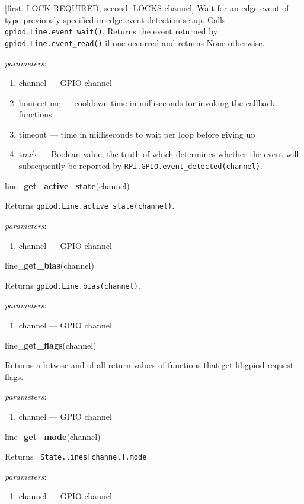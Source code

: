 \documentclass[12pt]{article}
\begin{document}
[first: LOCK REQUIRED, second: LOCKS channel]
Wait for an edge event of type previously specified in edge event detection setup. Calls \texttt{gpiod.Line.event\_wait()}. Returns the event returned by \texttt{gpiod.Line.event\_read()} if one occurred and returns None otherwise. 

\textit{parameters}:
\begin{enumerate}      
        \item channel --- GPIO channel
        \item bouncetime --- cooldown time in milliseconds for invoking the callback functions
        \item timeout --- time in milliseconds to wait per loop before giving up
        \item track --- Boolean value, the truth of which determines whether the event will subsequently be reported by \texttt{RPi.GPIO.event\_detected(channel)}.
\end{enumerate}

\noindent line\_\textbf{get\_active\_state}(channel)

Returns \texttt{gpiod.Line.active\_state(channel)}.

\textit{parameters}:
\begin{enumerate}      
        \item channel --- GPIO channel
\end{enumerate}

\noindent line\_\textbf{get\_bias}(channel)

Returns \texttt{gpiod.Line.bias(channel)}.

\textit{parameters}:
\begin{enumerate}      
        \item channel --- GPIO channel
\end{enumerate}

\noindent line\_\textbf{get\_flags}(channel)

Returns a bitwise-and of all return values of functions that get libgpiod request flags.

\textit{parameters}:
\begin{enumerate}      
        \item channel --- GPIO channel
\end{enumerate}

\noindent line\_\textbf{get\_mode}(channel)

Returns \texttt{\_State.lines[channel].mode}

\textit{parameters}:
\begin{enumerate}      
        \item channel --- GPIO channel
\end{enumerate}
\end{document}

